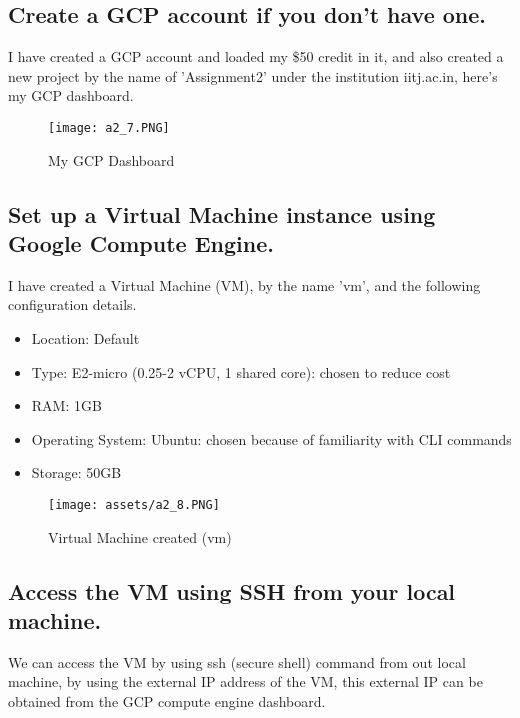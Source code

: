 \documentclass[12pt]{article}
\begin{document}
\subsection{Create a GCP account if you don't have one.}
I have created a GCP account and loaded my \$50 credit in it, and also created a new project by the name of 'Assignment2' under the institution iitj.ac.in, here's my GCP dashboard.

\begin{figure}[H]
    \centering
    \texttt{[image: a2\_7.PNG]}
    \caption{My GCP Dashboard}
    \label{fig:logo}
\end{figure}


\subsection{Set up a Virtual Machine instance using Google Compute Engine.}
I have created a Virtual Machine (VM), by the name 'vm', and the following configuration details.

\begin{itemize}[noitemsep]
  \itemsep0.5em
  \item Location: Default
  \item Type: E2-micro (0.25-2 vCPU, 1 shared core): chosen to reduce cost
  \item RAM: 1GB
  \item Operating System: Ubuntu: chosen because of familiarity with CLI commands
  \item Storage: 50GB
\end{itemize}

\begin{figure}[H]
    \centering
    \texttt{[image: assets/a2\_8.PNG]}
    \caption{Virtual Machine created (vm)}
    \label{fig:logo}
\end{figure}

%     

\subsection{Access the VM using SSH from your local machine.}
We can access the VM by using ssh (secure shell) command from out local machine, by using the external IP address of the VM, this external IP can be obtained from the GCP compute engine dashboard.
\end{document}
